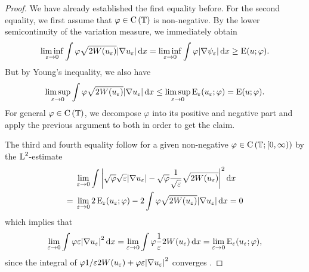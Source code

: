 \begin{proof}
	We have already established the first equality before. For the second 
	equality, we first assume that $ \varphi \in \operatorname{C} \left( \operatorname{\mathbb{T}}  
	\right) $ is non-negative.
	By the lower semicontinuity of the variation measure, we immediately obtain
	\begin{equation*}
		\liminf_{ \varepsilon \to 0 }
		\int
		\varphi
		\sqrt{ 2 W ( u_{ \varepsilon } ) }
		\abs{ \nabla u_{ \varepsilon } }
		\dd{ x }
		=
		\liminf_{ \varepsilon \to 0 }
		\int
		\varphi
		\abs{ \nabla \psi_{ \varepsilon } }
		\dd{ x }
		\geq
		\operatorname{E} ( u ; \varphi ).
	\end{equation*}
	But by Young's inequality, we also have 
	\begin{equation*}
		\limsup_{ \varepsilon \to 0 }
		\int
		\varphi
		\sqrt{ 2 W ( u_{ \varepsilon } ) }
		\abs{ \nabla u_{ \varepsilon } }
		\dd{ x }
		\leq
		\limsup_{ \varepsilon \to 0 }
		\operatorname{E}_{ \varepsilon } ( u_{ \varepsilon } ; \varphi )
		= \operatorname{E} ( u ; \varphi ).
	\end{equation*}
	For general $ \varphi \in \operatorname{C} \left( \operatorname{\mathbb{T}} \right) $, we decompose $ 
	\varphi $ into its positive and negative part and apply the previous 
	argument to both in order to get the claim.
	
	The third and fourth equality follow for a given non-negative $ \varphi 
	\in \operatorname{C} \left( \operatorname{\mathbb{T}} ; [ 0 , \infty ) \right) $ by the 
	$ \operatorname{L}^{ 2 } $-estimate
	\begin{align*}
		& \lim_{ \varepsilon \to 0 }
		\int
		\abs{ \sqrt{ \varphi } \sqrt{ \varepsilon } \abs{ \nabla u_{ 
					\varepsilon } } - \sqrt{ \varphi } \frac{ 1 }{ \sqrt{ 
					\varepsilon } } 
			\sqrt{ 2 W ( u_{ \varepsilon } ) } }^{ 2 }
		\dd{ x }
		\\
		={} &
		\lim_{ \varepsilon \to 0 }
		2 \operatorname{E}_{ \varepsilon } ( u_{ \varepsilon } ; \varphi )
		-
		2 \int	
		\varphi
		\sqrt{ 2 W ( u_{ \varepsilon } ) }
		\abs{ \nabla u_{ \varepsilon } }
		\dd{ x }
		=
		0
	\end{align*}
	which implies that 
	\begin{equation*}
		\lim_{ \varepsilon \to 0 }
		\int
		\varphi
		\varepsilon
		\abs{ \nabla u_{ \varepsilon } }^{ 2 }
		\dd{ x }
		=
		\lim_{ \varepsilon \to 0}
		\int
		\varphi
		\frac{ 1 }{ \varepsilon }
		2 W ( u_{ \varepsilon } )
		\dd{ x }
		=
		\lim_{ \varepsilon \to 0 }
		\operatorname{E}_{ \varepsilon } ( u_{ \varepsilon } ; \varphi ),
	\end{equation*}
	since the integral of $ \varphi 1/ \varepsilon 2 W ( u_{ \varepsilon } ) + 
	\varphi \varepsilon \abs{ \nabla u_{\varepsilon } }^{ 2 } $ converges .
\end{proof}

